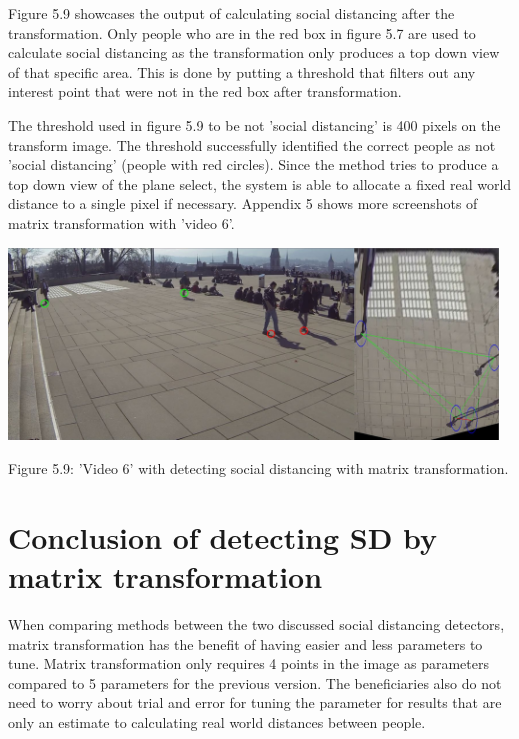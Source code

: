 \documentclass[12pt]{report}
\begin{document}
Figure 5.9 showcases the output of calculating social distancing after the transformation. Only people who are in the red box in figure 5.7 are used to calculate social distancing as the transformation only produces a top down view of that specific area. This is done by putting a threshold that filters out any interest point that were not in the red box after transformation. 

\vspace{2mm}

The threshold used in figure 5.9 to be not 'social distancing' is 400 pixels on the transform image. The threshold successfully identified the correct people as not 'social distancing' (people with red circles). Since the method tries to produce a top down view of the plane select, the system is able to allocate a fixed real world distance to a single pixel if necessary. Appendix 5 shows more screenshots of matrix transformation with 'video 6'.


\begin{center}
	\includegraphics[width=130mm]{./images/appendix/MatrixTransExample3.JPG}
	
	{\footnotesize Figure 5.9: 'Video 6' with detecting social distancing with matrix transformation.}
\end{center}

\section*{Conclusion of detecting SD by matrix transformation}

When comparing methods between the two discussed social distancing detectors, matrix transformation has the benefit of having easier and less parameters to tune. Matrix transformation only requires 4 points in the image as parameters compared to 5 parameters for the previous version. The beneficiaries also do not need to worry about trial and error for tuning the parameter for results that are only an estimate to calculating real world distances between people.
\end{document}

